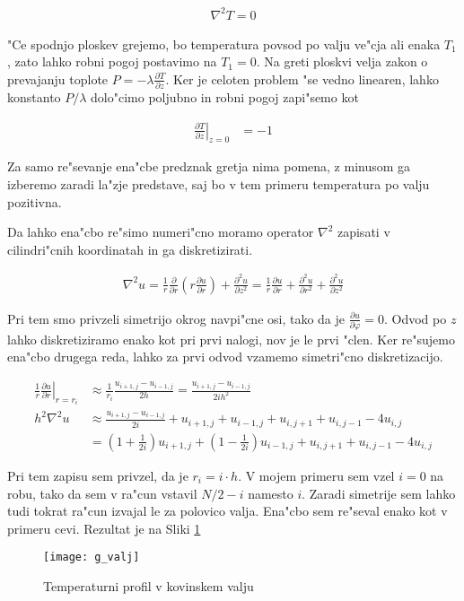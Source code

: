 \documentclass[a4paper,10pt]{article}
\renewcommand{\phi}{\varphi}
\newcommand{\parcialno}[2]{
  \frac{\partial #1}{\partial #2}
}
\newcommand{\parcdva}[2]{
  \frac{\partial^2 #1}{\partial #2 ^2}
}
\begin{document}
\begin{align}
  \nabla^2 T = 0
\end{align}

"Ce spodnjo ploskev grejemo, bo temperatura povsod po valju ve"cja ali enaka $T_1$, zato lahko robni pogoj postavimo na $T_1=0$. Na greti ploskvi velja zakon o prevajanju toplote $P = -\lambda \parcialno{T}{z}$. Ker je celoten problem "se vedno linearen, lahko konstanto $P/\lambda$ dolo"cimo poljubno in robni pogoj zapi"semo kot

\begin{align}
  \left.\parcialno{T}{z}\right|_{z=0} &= -1
\end{align}

Za samo re"sevanje ena"cbe predznak gretja nima pomena, z minusom ga izberemo zaradi la"zje predstave, saj bo v tem primeru temperatura po valju pozitivna. 

Da lahko ena"cbo re"simo numeri"cno moramo operator $\nabla^2$ zapisati v cilindri"cnih koordinatah in ga diskretizirati. 

\begin{align}
  \nabla^2u = \frac{1}{r} \parcialno{}{r} \left(r\parcialno{u}{r}\right) + \parcdva{u}{z} = \frac{1}{r} \parcialno{u}{r} +  \parcdva{u}{r} + \parcdva{u}{z}
\end{align}

Pri tem smo privzeli simetrijo okrog navpi"cne osi, tako da je $\parcialno{u}{\phi} = 0$. Odvod po $z$ lahko diskretiziramo enako kot pri prvi nalogi, nov je le prvi "clen. Ker re"sujemo ena"cbo drugega reda, lahko za prvi odvod vzamemo simetri"cno diskretizacijo. 

\begin{align}
  \left.\frac{1}{r}\parcialno{u}{r}\right|_{r=r_i} &\approx \frac{1}{r_i} \frac{u_{i+1,j}-u_{i-1,j}}{2h} = \frac{u_{i+1,j}-u_{i-1,j}}{2ih^2} \\
  h^2\nabla^2 u &\approx \frac{u_{i+1,j}-u_{i-1,j}}{2i} + u_{i+1,j} + u_{i-1,j} + u_{i,j+1} + u_{i,j-1} - 4u_{i,j} \\
&= (1+\frac{1}{2i})u_{i+1,j} + (1-\frac{1}{2i})u_{i-1,j} + u_{i,j+1} + u_{i,j-1} - 4u_{i,j} 
\end{align}

Pri tem zapisu sem privzel, da je $r_i = i\cdot h$. V mojem primeru sem vzel $i=0$ na robu, tako da sem v ra"cun vstavil $N/2-i$ namesto $i$. Zaradi simetrije sem lahko tudi tokrat ra"cun izvajal le za polovico valja. Ena"cbo sem re"seval enako kot v primeru cevi. Rezultat je na Sliki \ref{fig:valj}

\begin{figure}[H]
\centering
  \texttt{[image: g\_valj]}
  \caption{Temperaturni profil v kovinskem valju}
  \label{fig:valj}
\end{figure}
\end{document}
